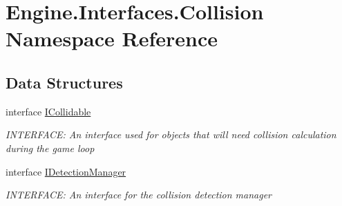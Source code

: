 \hypertarget{a00255}{}\section{Engine.\+Interfaces.\+Collision Namespace Reference}
\label{a00255}
\subsection*{Data Structures}
\begin{DoxyCompactItemize}
\item 
interface \hyperlink{a00426}{I\+Collidable}
\begin{DoxyCompactList}\small\item\em I\+N\+T\+E\+R\+F\+A\+CE\+: An interface used for objects that will need collision calculation during the game loop \end{DoxyCompactList}\item 
interface \hyperlink{a00430}{I\+Detection\+Manager}
\begin{DoxyCompactList}\small\item\em I\+N\+T\+E\+R\+F\+A\+CE\+: An interface for the collision detection manager \end{DoxyCompactList}\end{DoxyCompactItemize}
